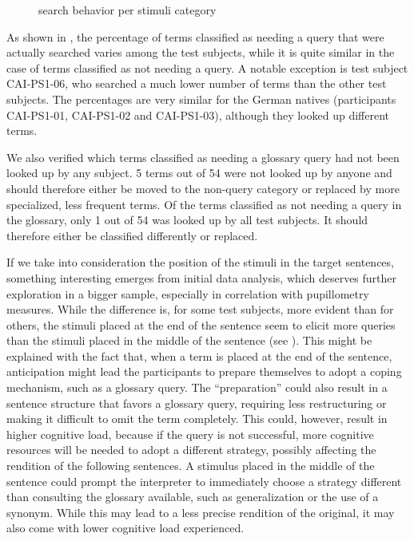 \documentclass[output=paper]{langsci/langscibook}
\begin{document}
\begin{stylecaption}\begin{figure}
\caption{search behavior per stimuli category}
\label{fig:key:9}
\end{figure}\end{stylecaption}

As shown in , the percentage of terms classified as needing a query that were actually searched varies among the test subjects, while it is quite similar in the case of terms classified as not needing a query. A notable exception is test subject CAI-PS1-06, who searched a much lower number of terms than the other test subjects. The percentages are very similar for the German natives (participants CAI-PS1-01, CAI-PS1-02 and CAI-PS1-03), although they looked up different terms.

We also verified which terms classified as needing a glossary query had not been looked up by any subject. 5 terms out of 54 were not looked up by anyone and should therefore either be moved to the non-query category or replaced by more specialized, less frequent terms. Of the terms classified as not needing a query in the glossary, only 1 out of 54 was looked up by all test subjects. It should therefore either be classified differently or replaced. 

If we take into consideration the position of the stimuli in the target sentences, something interesting emerges from initial data analysis, which deserves further exploration in a bigger sample, especially in correlation with pupillometry measures. While the difference is, for some test subjects, more evident than for others, the stimuli placed at the end of the sentence seem to elicit more queries than the stimuli placed in the middle of the sentence (see ). This might be explained with the fact that, when a term is placed at the end of the sentence, anticipation might lead the participants to prepare themselves to adopt a coping mechanism, such as a glossary query. The “preparation” could also result in a sentence structure that favors a glossary query, requiring less restructuring or making it difficult to omit the term completely. This could, however, result in higher cognitive load, because if the query is not successful, more cognitive resources will be needed to adopt a different strategy, possibly affecting the rendition of the following sentences. A stimulus placed in the middle of the sentence could prompt the interpreter to immediately choose a strategy different than consulting the glossary available, such as generalization or the use of a synonym. While this may lead to a less precise rendition of the original, it may also come with lower cognitive load experienced.
\end{document}

